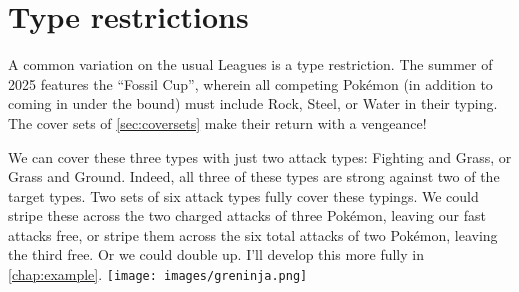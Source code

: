 

\section{Type restrictions\label{sec:typeleagues}}
A common variation on the usual Leagues is a type restriction.
The summer of 2025 features the ``Fossil Cup'', wherein all competing
  Pokémon (in addition to coming in under the  bound)
  must include Rock, Steel, or Water in their typing.
The cover sets of \autoref{sec:coversets} make their return with a vengeance!

We can cover these three types with just two attack types: Fighting and Grass, or Grass and Ground.
Indeed, all three of these types are strong against two of the target types.
Two sets of six attack types fully cover these typings.
We could stripe these across the two charged attacks of three Pokémon,
  leaving our fast attacks free, or stripe them across the six total
  attacks of two Pokémon, leaving the third free.
Or we could double up.
I'll develop this more fully in \autoref{chap:example}.
\vfill{\centering\texttt{[image: images/greninja.png]}}\vfill
